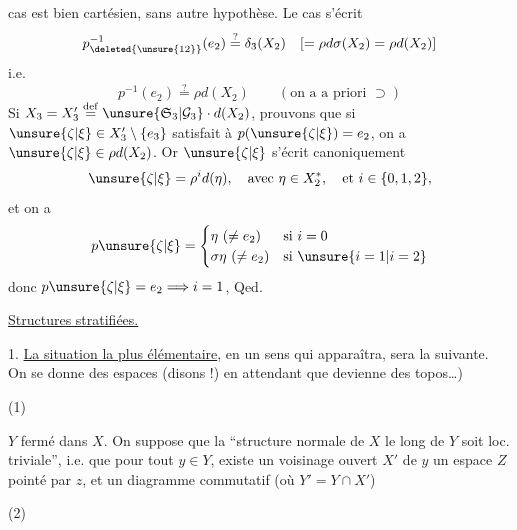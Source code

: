  cas est bien cartésien, sans autre hypothèse. Le cas \unsure{$(**)$} s'écrit
\[
p_{\deleted{\unsure{12}}}^{-1}(e_2)\overset{?}=\delta_3(X_2)\quad[=\rho d\sigma(X_2)=\rho d(X_2)]
\]
 i.e.
\[
p^{-1}(e_2)\overset{?}=\rho d(X_2)\qquad(\text{on a a priori }\supset)
\]
Si $X_3=X'_3\overset{\mathrm{def}}=\unsure{\mathfrak S_3|\mathcal G_3}\cdot d(X_2)$,
 prouvons que  si $\unsure{\zeta|\xi}\in X'_3\setminus\{e_3\}$ satisfait à $p(\unsure{\zeta|\xi})=e_2$, on a $\unsure{\zeta|\xi}\in\rho d(X_2)$. Or $\unsure{\zeta|\xi}$ s'écrit canoniquement
\[
\unsure{\zeta|\xi}=\rho^i d(\eta),\quad\text{avec }\eta\in X_2^*,\quad\text{et }i\in\{0,1,2\},
\]
et on a
\[
p\unsure{\zeta|\xi}=\begin{cases}
\eta\ (\ne e_2)&\text{si }i=0\\
\sigma\eta\ (\ne e_2)&\text{si }\unsure{i=1|i=2}
\end{cases}
\]
donc $p\unsure{\zeta|\xi}=e_2\Longrightarrow i=1$, Qed.


\uline{Structures stratifiées.}

1. \uline{La situation la plus élémentaire}, en un sens qui apparaîtra, sera la suivante. On se donne des espaces (disons !) en attendant que  devienne des topos\ldots)

(1)

$Y$ fermé dans $X$. On suppose que la ``structure normale de $X$ le long de $Y$ soit loc. triviale''\unsure{)}, i.e. que pour tout $y\in Y$, existe un voisinage ouvert $X'$ de $y$  un espace $Z$ pointé par $z$, et un diagramme commutatif (où $Y'=Y\cap X'$)

(2)

